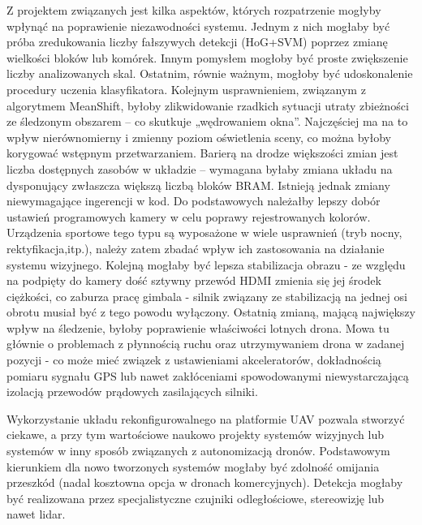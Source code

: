 Z projektem związanych jest kilka aspektów, których rozpatrzenie mogłyby wpłynąć na poprawienie niezawodności systemu. Jednym z nich mogłaby być próba zredukowania liczby fałszywych detekcji (HoG+SVM) poprzez zmianę wielkości bloków lub komórek. %
Innym pomysłem mogłoby być proste zwiększenie liczby analizowanych skal. Ostatnim, równie ważnym, mogłoby być udoskonalenie procedury uczenia klasyfikatora.%
Kolejnym usprawnieniem, związanym z algorytmem MeanShift, byłoby zlikwidowanie rzadkich sytuacji utraty zbieżności ze śledzonym obszarem -- co skutkuje „wędrowaniem okna”. Najczęściej ma na to wpływ nierównomierny i zmienny poziom oświetlenia sceny, co można byłoby korygować wstępnym przetwarzaniem. %
Barierą na drodze większości zmian jest liczba dostępnych zasobów w układzie -- wymagana byłaby zmiana układu na dysponujący zwłaszcza większą liczbą bloków BRAM. 
Istnieją jednak zmiany niewymagające ingerencji w kod. 
Do podstawowych należałby lepszy dobór ustawień programowych kamery w celu poprawy rejestrowanych kolorów. Urządzenia sportowe tego typu są wyposażone w wiele usprawnień (tryb nocny, rektyfikacja,itp.), należy zatem zbadać wpływ ich zastosowania na działanie systemu wizyjnego. %
Kolejną mogłaby być lepsza stabilizacja obrazu - ze względu na podpięty do kamery dość sztywny przewód HDMI zmienia się jej środek ciężkości, co zaburza pracę gimbala - silnik związany ze stabilizacją na jednej osi obrotu musiał być z tego powodu wyłączony. %
Ostatnią zmianą, mającą największy wpływ na śledzenie, byłoby poprawienie właściwości lotnych drona. Mowa tu głównie o problemach z płynnością ruchu oraz utrzymywaniem drona w zadanej pozycji - co może mieć związek z ustawieniami akceleratorów,  dokładnością pomiaru sygnału GPS lub nawet zakłóceniami spowodowanymi niewystarczającą izolacją przewodów prądowych zasilających silniki.%

Wykorzystanie układu rekonfigurowalnego na platformie UAV pozwala stworzyć ciekawe, a przy tym wartościowe naukowo projekty systemów wizyjnych lub systemów w inny sposób związanych z autonomizacją dronów.
Podstawowym kierunkiem dla nowo tworzonych systemów mogłaby być zdolność omijania przeszkód (nadal kosztowna opcja w dronach komercyjnych). Detekcja mogłaby być realizowana przez specjalistyczne czujniki odległościowe, stereowizję lub nawet lidar. %



